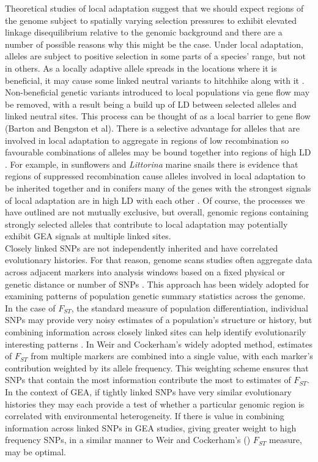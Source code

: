 \documentclass[10pt,twoside,lineno, twocolumn]{GSA_format}
\begin{document}
Theoretical studies of local adaptation suggest that we should expect regions of the genome subject to spatially varying selection pressures to exhibit elevated linkage disequilibrium relative to the genomic background and there are a number of possible reasons why this might be the case. Under local adaptation, alleles are subject to positive selection in some parts of a species' range, but not in others. As a locally adaptive allele spreads in the locations where it is beneficial, it may cause some linked neutral variants to hitchhike along with it \citep{Sakamoto2019}. Non-beneficial genetic variants introduced to local populations via gene flow may be removed, with a result being a build up of LD between selected alleles and linked neutral sites. This process can be thought of as a local barrier to gene flow (Barton and Bengston et al). There is a selective advantage for alleles that are involved in local adaptation to aggregate in regions of low recombination so favourable combinations of alleles may be bound together into regions of high LD \citep{Rieseberg2001, Noor2001, Kirkpatrick2006, Yeaman2013}. For example, in sunflowers and \textit{Littorina} marine snails there is evidence that regions of suppressed recombination cause alleles involved in local adaptation to be inherited together \citep{Morales2019, Todesco2020} and in conifers many of the genes with the strongest signals of local adaptation are in high LD with each other \citep{Yeaman2016}. Of course, the processes we have outlined are not mutually exclusive, but overall, genomic regions containing strongly selected alleles that contribute to local adaptation may potentially exhibit GEA signals at multiple linked sites. \\

Closely linked SNPs are not independently inherited and have correlated evolutionary histories. For that reason, genome scans studies often aggregate data across adjacent markers into analysis windows based on a fixed physical or genetic distance or number of SNPs \citep{Hoban2016}. This approach has been widely adopted for examining patterns of population genetic summary statistics across the genome. In the case of $F_{ST}$, the standard measure of population differentiation, individual SNPs may provide very noisy estimates of a population's structure or history, but combining information across closely linked sites can help identify evolutionarily interesting patterns \citep{Hoban2016}. In Weir and Cockerham's \citeyear{Weir1984-tc} widely adopted method, estimates of $F_{ST}$ from multiple markers are combined into a single value, with each marker's contribution weighted by its allele frequency. This weighting scheme ensures that SNPs that contain the most information contribute the most to estimates of $F_{ST}$. In the context of GEA, if tightly linked SNPs have very similar evolutionary histories they may each provide a test of whether a particular genomic region is correlated with environmental heterogeneity. If there is value in combining information across linked SNPs in GEA studies, giving greater weight to high frequency SNPs, in a similar manner to Weir and Cockerham's (\citeyear{Weir1984-tc}) $F_{ST}$ measure, may be optimal. \\
\end{document}
